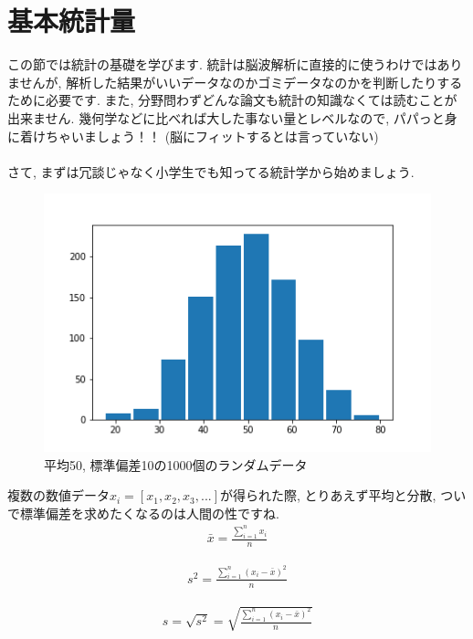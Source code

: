 \documentclass[11pt,a4paper]{jreport}
\begin{document}
\section{基本統計量}
この節では統計の基礎を学びます. 統計は脳波解析に直接的に使うわけではありませんが, 解析した結果がいいデータなのかゴミデータなのかを判断したりするために必要です. また, 分野問わずどんな論文も統計の知識なくては読むことが出来ません. 幾何学などに比べれば大した事ない量とレベルなので, パパっと身に着けちゃいましょう！！ (脳にフィットするとは言っていない)\\
\\
さて, まずは冗談じゃなく小学生でも知ってる統計学から始めましょう.\\

\begin{figure}[H]
\label{im:histgram}
  \centering
  \includegraphics[width=120mm,bb=0 0 432 288]{../figures/hist.png}
  \caption{平均50, 標準偏差10の1000個のランダムデータ}
\end{figure}

複数の数値データ$x_i = [x_1, x_2, x_3, ...]$が得られた際, とりあえず平均と分散, ついで標準偏差を求めたくなるのは人間の性ですね.\\


\begin{eqnarray}
\label{eq:ave}
\bar{x} = \frac{\sum_{i=1}^{n} x_i}{n}
\end{eqnarray}

\begin{eqnarray}
\label{eq:var}
s^2 = \frac{\sum_{i=1}^{n} (x_i - \bar{x})^2}{n}
\end{eqnarray}

\begin{eqnarray}
\label{eq:dev}
s = \sqrt{s^2} = \sqrt{\frac{\sum_{i=1}^{n} (x_i - \bar{x})^2}{n}}
\end{eqnarray}
\end{document}
